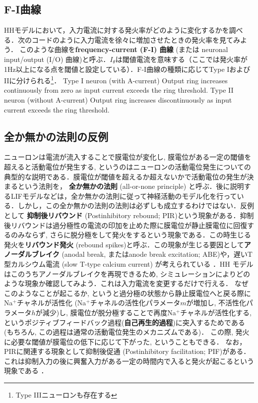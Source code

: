 \subsection{F-I曲線}
HHモデルにおいて，入力電流に対する発火率がどのように変化するかを調べる．次のコードのように入力電流を徐々に増加させたときの発火率を見てみよう．
このような曲線を\textbf{frequency-current (F-I) 曲線} (または neuronal input/output (I/O) 曲線)と呼ぶ．$I_\theta$は閾値電流を意味する（ここでは発火率が1Hz以上になる点を閾値と設定している）．F-I曲線の種類に応じてType IおよびIIに分けられる\footnote{Type IIIニューロンも存在する}．
Type I neuron (with A-current) Output ring increases continuously from zero as input current exceeds the ring threshold. 
Type II neuron (without A-current)
Output ring increases discontinuously as input current exceeds the ring threshold.
\subsection{全か無かの法則の反例}
ニューロンは電流が流入することで膜電位が変化し, 膜電位がある一定の閾値を超えると活動電位が発生する, というのはニューロンの活動電位発生についての典型的な説明である．膜電位が閾値を超えるか超えないかで活動電位の発生が決まるという法則を， \textbf{全か無かの法則} (all-or-none principle) と呼ぶ．後に説明するLIFモデルなどは，全か無かの法則に従って神経活動のモデル化を行っている．しかし，この全か無かの法則の法則は必ずしも成立するわけではない．反例として \textbf{抑制後リバウンド} (Postinhibitory rebound; PIR)という現象がある．抑制後リバウンドは過分極性の電流の印加を止めた際に膜電位が静止膜電位に回復するのみならず, さらに脱分極をして発火をするという現象である．この時生じる発火を\textbf{リバウンド発火} (rebound spikes)と呼ぶ．この現象が生じる要因として\textbf{アノーダルブレイク} (anodal break, またはanode break excitation; ABE)や，遅いT型カルシウム電流 (slow T-type calcium current) が考えられている \citep{Chik2004-ka}．HH モデルはこのうちアノーダルブレイクを再現できるため, シミュレーションによりどのような現象か確認してみよう．これは入力電流を変更するだけで行える．
なぜこのようなことが起こるか, というと過分極の状態から静止膜電位へと戻る際にNa$^+$チャネルが活性化 (Na$^+$チャネルの活性化パラメータ$m$が増加し, 不活性化パラメータ$h$が減少)し, 膜電位が脱分極することで再度Na$^+$チャネルが活性化する, というポジティブフィードバック過程(\textbf{自己再生的過程})に突入するためである (もちろん, この過程は通常の活動電位発生のメカニズムである)． この際, 発火に必要な閾値が膜電位の低下に応じて下がった, ということもできる．
なお，PIRに関連する現象として抑制後促通 (Postinhibitory facilitation; PIF)がある．これは抑制入力の後に興奮入力がある一定の時間内で入ると発火が起こるという現象である \citep{Dodla2006-fj}．
